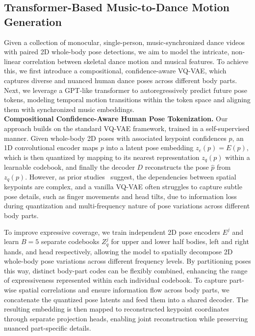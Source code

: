 \subsection{Transformer-Based Music-to-Dance Motion Generation}
\label{sec:trans}

Given a collection of monocular, single-person, music-synchronized dance videos with paired 2D whole-body pose detections, we aim to model the intricate, non-linear correlation between skeletal dance motion and musical features. To achieve this, we first introduce a compositional, confidence-aware VQ-VAE, which captures diverse and nuanced human dance poses across different body parts. Next, we leverage a GPT-like transformer to autoregressively predict future pose tokens, modeling temporal motion transitions within the token space and aligning them with synchronized music embeddings.
\\
\noindent\textbf{Compositional Confidence-Aware Human Pose Tokenization.}  Our approach builds on the standard VQ-VAE framework, trained in a self-supervised manner. Given whole-body 2D poses with associated keypoint confidences $p$,  
an 1D convolutional encoder maps $p$ into a latent pose embedding $z_e(p) = E(p),$ which is then quantized by mapping to its nearest representation $z_q(p)$ within a learnable codebook,  and finally the decoder $D$ reconstructs the pose $\hat{p}$ from $z_q(p).$ However, as prior studies~\cite{bailando,yi2023generating,wang2024holistic} suggest, the dependencies between spatial keypoints are complex, and a vanilla VQ-VAE often struggles to capture subtle pose details, such as finger movements and head tilts, due to information loss during quantization and multi-frequency nature of pose variations across different body parts. 

To improve expressive coverage, we train independent 2D pose encoders $E^j$ and learn $B=5$ separate codebooks $Z^j_q$ for upper and lower half bodies, left and right hands, and head respectively,  allowing the model to spatially decompose 2D whole-body pose variations across different frequency levels. By partitioning poses this way, distinct body-part codes can be flexibly combined, enhancing the range of expressiveness represented within each individual codebook. To capture part-wise spatial correlations and ensure information flow across body parts, we concatenate the quantized pose latents and feed them into a shared decoder. The resulting embedding is then mapped to reconstructed keypoint coordinates through separate projection heads, enabling joint reconstruction while preserving nuanced part-specific details.

